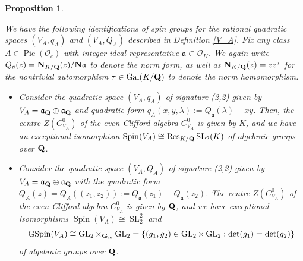\documentclass{amsart}
\newtheorem{proposition}[theorem]{Proposition}
\theoremstyle{definition}
\begin{document}
\begin{proposition}\label{spinID} 

We have the following identifications of spin groups for the rational quadratic spaces $(V_A, q_A)$ and $(V_A, Q_A)$ described in Definition \ref{V_A}.
Fix any class $A \in \operatorname{Pic}(\mathcal{O}_c)$ with integer ideal representative $\mathfrak{a} \subset \mathcal{O}_K$. 
We again write $Q_{\mathfrak{a}} (z) = {\bf{N}}_{K/{\bf{Q}}}(z)/{\bf{N}} \mathfrak{a}$ to denote the norm form, as well
as ${\bf{N}}_{K/{\bf{Q}}}(z) = z z^{\tau}$ for the nontrivial automorphism $\tau \in \operatorname{Gal}(K/{\bf{Q}})$ to denote the norm homomorphism. \\

\begin{itemize}

\item[(i)] Consider the quadratic space $(V_A, q_A)$ of signature (2,2) given by $V_A = \mathfrak{a}_{\bf{Q}} \oplus \mathfrak{a}_{\bf{Q}}$
and quadratic form $q_A(x, y, \lambda) := Q_{\mathfrak{a}}(\lambda) - xy$. Then, the centre $Z(C_{V_A}^0)$ of the even Clifford
algebra $C_{V_A}^0$ is given by $K$, and we have an exceptional isomorphism 
$\operatorname{Spin}(V_A) \cong \operatorname{Res}_{K/{\bf{Q}}} \operatorname{SL}_2(K)$ of algebraic groups over ${\bf{Q}}$. \\

\item[(ii)] Consider the quadratic space $(V_A, Q_A)$ of signature (2,2) given by  $V_A = \mathfrak{a}_{\bf{Q}} \oplus \mathfrak{a}_{\bf{Q}}$
with the quadratic form $Q_A(z) = Q_A((z_1, z_2)) := Q_{\mathfrak{a}}(z_1) - Q_{\mathfrak{a}}(z_2)$. The centre $Z(C_{V_A}^0)$ of the even Clifford
algebra $C_{V_A}^0$ is given by ${\bf{Q}}$, and we have exceptional isomorphisms $\operatorname{Spin}(V_A) \cong \operatorname{SL}_2^2$ and 
\begin{align*} \operatorname{GSpin}(V_A) \cong  \operatorname{GL}_2 \times_{{\bf{G}}_m} \operatorname{GL}_2
= \left\lbrace (g_1, g_2) \in \operatorname{GL}_2 \times \operatorname{GL}_2 : \det(g_1) = \det(g_2) \right\rbrace\end{align*}
of algebraic groups over ${\bf{Q}}$. \\
\end{itemize}

\end{proposition}
\end{document}

